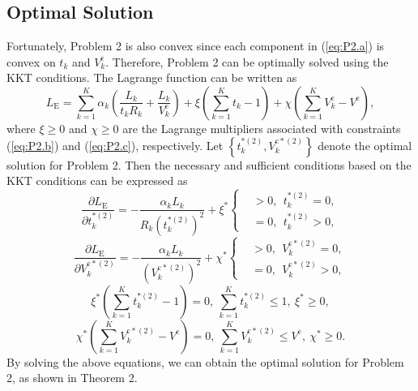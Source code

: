 \documentclass[journal,draftcls,onecolumn,12pt,twoside]{IEEEtran}
\begin{document}
\subsection{Optimal Solution}
Fortunately, Problem 2 is also convex since each component in (\ref{eq:P2.a}) is convex on $t_k$ and $V_k^{\text{c}}$. Therefore, Problem 2 can be optimally solved using the KKT conditions. The Lagrange function can be written as
\begin{equation}
     L_{\text{E}}=\sum_{k=1}^K \alpha_k \left(\frac{L_k}{t_kR_k}+\frac{L_k}{V_k^{\text{c}}}\right) + \xi\left(\sum_{k=1}^K t_k -1\right)+\chi \left(\sum_{k=1}^K V_k^{\text{c}}-V^{\text{c}}\right),\label{13}
\end{equation}
where $\xi \ge 0$ and $\chi \ge 0$ are the Lagrange multipliers associated with constraints (\ref{eq:P2.b}) and (\ref{eq:P2.c}), respectively. Let $\left\{t_k^{*(2)},V_k^{\text{c}*(2)}\right\}$ denote the optimal solution for Problem 2. Then the necessary and sufficient conditions based on the KKT conditions can be expressed as
\begin{equation}
    \frac{\partial L_{\text{E}}}{\partial t_k^{*(2)}}=-\frac{\alpha_k L_k}{ R_k\left(t_k^{*(2)}\right)^2}+\xi^*
    \left\{
    \begin{aligned}
        &>0,~~t_k^{*(2)}=0,\\
        &=0,~~t_k^{*(2)}>0,
    \end{aligned}
    \right. \label{14}
\end{equation}
\begin{equation}
    \frac{\partial L_{\text{E}}}{\partial V_k^{\text{c}*(2)}}=-\frac{\alpha_k L_k}{\left(V_k^{\text{c}*(2)}\right)^2}+\chi^*
    \left\{
    \begin{aligned}
        &>0,~~V_k^{\text{c}*(2)}=0,\\
        &=0,~~V_k^{\text{c}*(2)}>0,
    \end{aligned}
    \right. \label{15}
\end{equation}
\begin{equation}
    \xi^*\left(\sum_{k=1}^K t_k^{*(2)} - 1\right)=0,~\sum_{k=1}^K t_k^{*(2)}\le 1,~\xi^* \ge 0,\label{16}
\end{equation}
\begin{equation}
    \chi^*\left(\sum_{k=1}^K V_k^{\text{c}*(2)}- V^{\text{c}}\right)=0,~\sum_{k=1}^K V_k^{\text{c}*(2)} \le V^{\text{c}},~\chi^* \ge 0. \label{17}
\end{equation}
By solving the above equations, we can obtain the optimal solution for Problem 2, as shown in Theorem 2.
\end{document}

